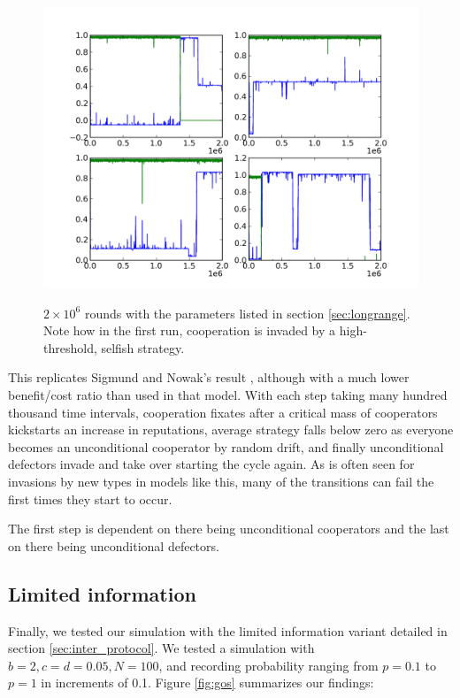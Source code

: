 \documentclass{amsart}
\begin{document}
\begin{figure}[h]
\caption{$2 \times 10^6$ rounds with the parameters listed in section
  \ref{sec:longrange}. Note how in the first run, cooperation is
  invaded by a high-threshold, selfish strategy.}

\includegraphics[width=\textwidth]{what.png}
\label{fig:what}
\end{figure}

This replicates Sigmund and Nowak's result
\cite{nowak_evolution_1998}, although with a much lower benefit/cost
ratio than used in that model. With each step taking many hundred
thousand time intervals, cooperation fixates after a critical mass of
cooperators kickstarts an increase in reputations, average strategy
falls below zero as everyone becomes an unconditional cooperator by
random drift, and finally unconditional defectors invade and take over
starting the cycle again. As is often seen for invasions by new types
in models like this, many of the transitions can fail the first times
they start to occur.

The first step is dependent on there being unconditional cooperators
and the last on there being unconditional defectors.

\subsection{Limited information}

Finally, we tested our simulation with the limited information variant
detailed in section \ref{sec:inter_protocol}. We tested a simulation
with $b=2, c=d=0.05, N=100$, and recording probability ranging from
$p=0.1$ to $p=1$ in increments of 0.1. Figure \ref{fig:gos} summarizes our findings:
\end{document}
